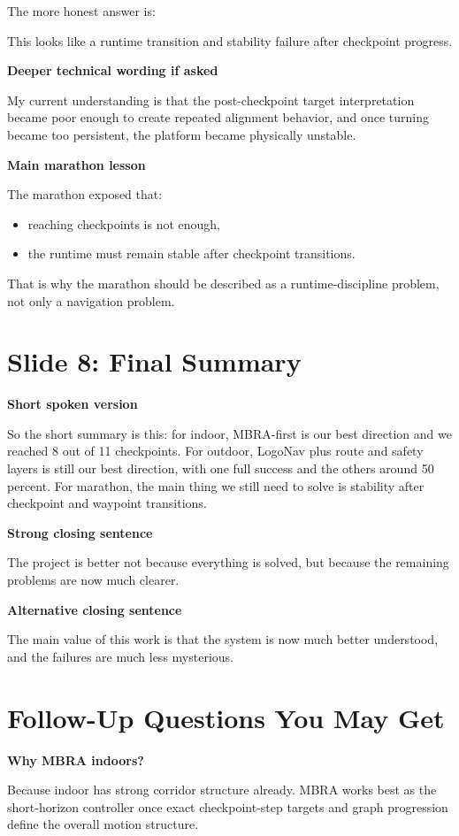 \documentclass[11pt]{article}
\begin{document}
The more honest answer is:

This looks like a runtime transition and stability failure after checkpoint progress.

\textbf{Deeper technical wording if asked}

My current understanding is that the post-checkpoint target interpretation became poor enough to create repeated alignment behavior, and once turning became too persistent, the platform became physically unstable.

\textbf{Main marathon lesson}

The marathon exposed that:
\begin{itemize}[leftmargin=*]
\item reaching checkpoints is not enough,
\item the runtime must remain stable after checkpoint transitions.
\end{itemize}

That is why the marathon should be described as a runtime-discipline problem, not only a navigation problem.

\section*{Slide 8: Final Summary}
\textbf{Short spoken version}

So the short summary is this: for indoor, MBRA-first is our best direction and we reached 8 out of 11 checkpoints. For outdoor, LogoNav plus route and safety layers is still our best direction, with one full success and the others around 50 percent. For marathon, the main thing we still need to solve is stability after checkpoint and waypoint transitions.

\textbf{Strong closing sentence}

The project is better not because everything is solved, but because the remaining problems are now much clearer.

\textbf{Alternative closing sentence}

The main value of this work is that the system is now much better understood, and the failures are much less mysterious.

\section*{Follow-Up Questions You May Get}
\textbf{Why MBRA indoors?}

Because indoor has strong corridor structure already. MBRA works best as the short-horizon controller once exact checkpoint-step targets and graph progression define the overall motion structure.
\end{document}
